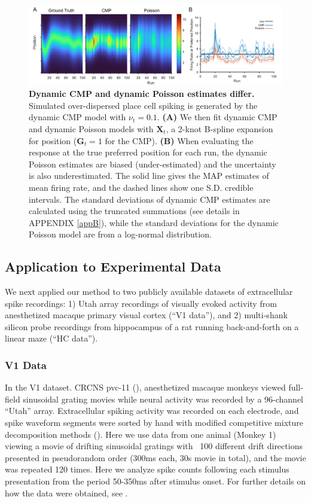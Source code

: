 \documentclass[aoas]{imsart}
\theoremstyle{plain}
\theoremstyle{remark}
\begin{document}
\begin{figure}[h!]
	\centering
	\includegraphics[width=1\textwidth]{figure3.png}
	\caption{\textbf{Dynamic CMP and dynamic Poisson estimates differ.} Simulated over-dispersed place cell spiking is generated by the dynamic CMP model with $\nu_t = 0.1$. \textbf{(A)} We then fit dynamic CMP and dynamic Poisson models with $\bm{X}_t$, a 2-knot B-spline expansion for position ($\bm{G}_t = 1$ for the CMP). \textbf{(B)} When evaluating the response at the true preferred position for each run, the dynamic Poisson estimates are biased (under-estimated) and the uncertainty is also underestimated. The solid line gives the MAP estimates of mean firing rate, and the dashed lines show one S.D. credible intervals. The standard deviations of dynamic CMP estimates are calculated using the truncated summations (see details in APPENDIX \ref{appB}), while the standard deviations for the dynamic Poisson model are from a log-normal distribution.}
	\label{fig3}
\end{figure}

\subsection{Application to Experimental Data}
We next applied our method to two publicly available datasets of extracellular spike recordings: 1) Utah array recordings of visually evoked activity from anesthetized macaque primary visual cortex (“V1 data”), and 2) multi-shank silicon probe recordings from hippocampus of a rat running back-and-forth on a linear maze (“HC data”).

\subsubsection{V1 Data}
In the V1 dataset. CRCNS pvc-11 (\cite{Kohn2016}), anesthetized macaque monkeys viewed full-field sinusoidal grating movies while neural activity was recorded by a 96-channel “Utah” array. Extracellular spiking activity was recorded on each electrode, and spike waveform segments were sorted by hand with modified competitive mixture decomposition methods (\cite{Shoham2003}). Here we use data from one animal (Monkey 1) viewing a movie of drifting sinusoidal gratings with ~100 different drift directions presented in pseudorandom order (300ms each, 30s movie in total), and the movie was repeated 120 times. Here we analyze spike counts following each stimulus presentation from the period 50-350ms after stimulus onset. For further details on how the data were obtained, see \cite{Kelly2010,Smith2008}.
\end{document}
